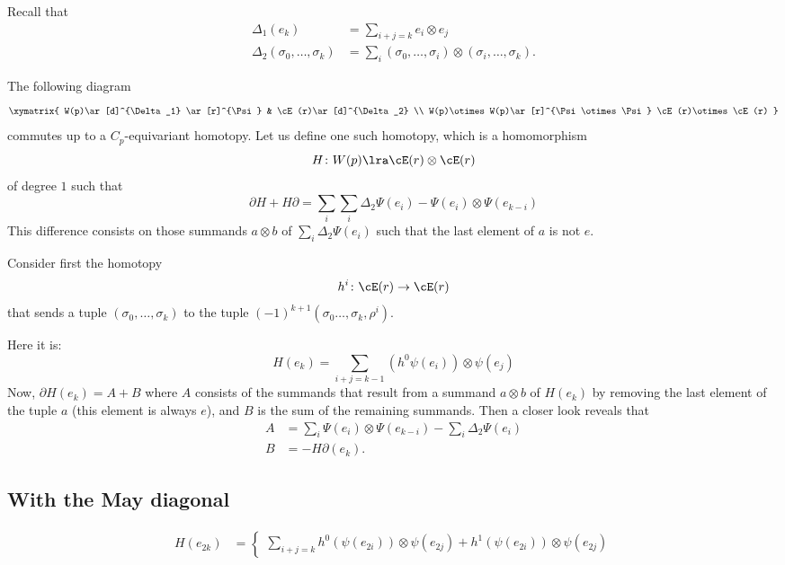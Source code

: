 Recall that
\begin{align*}
\Delta_1(e_k) &= \sum_{i+j=k} e_i\otimes e_j \\
\Delta_2(\sigma_0,\ldots,\sigma_k) &= \sum_{i} (\sigma_0,\ldots,\sigma_i)\otimes (\sigma_i,\ldots,\sigma_k).
\end{align*}

The following diagram
\[\xymatrix{
W(p)\ar[d]^{\Delta_1} \ar[r]^{\Psi} & \cE(r)\ar[d]^{\Delta_2} \\
W(p)\otimes W(p)\ar[r]^{\Psi\otimes\Psi} \cE(r)\otimes \cE(r)
}
\]
commutes up to a $C_p$-equivariant homotopy. Let us define one such homotopy, which is a homomorphism
\[H\colon W(p)\lra \cE(r)\otimes \cE(r)\]
of degree $1$ such that 
\[\partial H + H\partial = \sum_{i} \sum_{i} \Delta_2\Psi(e_i)-\Psi(e_i)\otimes \Psi(e_{k-i})
\]
This difference consists on those summands $a\otimes b$ of $\sum_i\Delta_2\Psi(e_i)$ such that the last element of $a$ is not $e$.


Consider first the homotopy
\[h^i\colon \cE(r)\to \cE(r)\]
that sends a tuple $(\sigma_0,\ldots,\sigma_k)$ to the tuple $(-1)^{k+1}(\sigma_0\ldots,\sigma_k,\rho^i)$.


Here it is:
\[H(e_k) = \sum_{i+j=k-1} (h^0\psi(e_i))\otimes \psi(e_j)\]
Now, $\partial H(e_k) = A + B$ where $A$ consists of the summands that result from a summand $a\otimes b$ of $H(e_k)$ by removing the last element of the tuple $a$ (this element is always $e$), and $B$ is the sum of the remaining summands. Then a closer look reveals that 
\begin{align*}
A &=  \sum_{i} \Psi(e_i)\otimes \Psi(e_{k-i}) - \sum_{i} \Delta_2\Psi(e_i) \\
B &= -H\partial(e_k). %
\end{align*}

\subsection{With the May diagonal}
\begin{align*}
H(e_{2k}) &= \begin{cases}
\sum_{i+j = k}  h^0(\psi(e_{2i}))\otimes \psi(e_{2j}) + h^1(\psi(e_{2i}))\otimes \psi(e_{2j})
\end{cases}
\end{align*}
